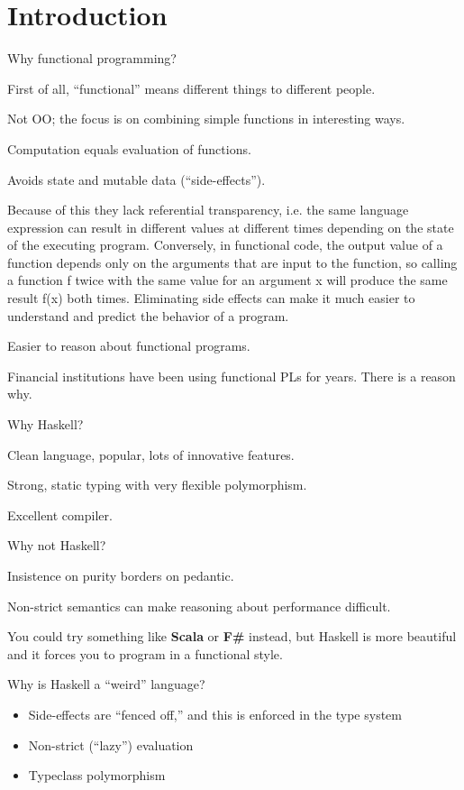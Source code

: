 
\section{Introduction}


%
\begin{frame}{Why functional programming?}

First of all, ``functional'' means different things to different people.

Not OO; the focus is on combining simple functions in interesting ways.

Computation equals evaluation of functions.

Avoids state and mutable data (``side-effects''). 

Because of this they lack referential transparency, i.e. the same language
expression can result in different values at different times depending on the
state of the executing program. Conversely, in functional code, the output value
of a function depends only on the arguments that are input to the function, so
calling a function f twice with the same value for an argument x will produce
the same result f(x) both times. Eliminating side effects can make it much
easier to understand and predict the behavior of a program.

Easier to reason about functional programs.

Financial institutions have been using functional PLs for years. There is a
reason why.

\end{frame}

%
\begin{frame}{Why Haskell?}

Clean language, popular, lots of innovative features.

Strong, static typing with very flexible polymorphism.

Excellent compiler.

\end{frame}

%
\begin{frame}{Why not Haskell?}

Insistence on purity borders on pedantic.

Non-strict semantics can make reasoning about performance difficult.

You could try something like \textbf{Scala} or \textbf{F\#} instead, but Haskell
is more beautiful and it forces you to program in a functional style.

\end{frame}

%
\begin{frame}{Why is Haskell a ``weird'' language?}

\begin{itemize}
  \item Side-effects are ``fenced off,'' and this is enforced in the type system
  \item Non-strict (``lazy'') evaluation
  \item Typeclass polymorphism
\end{itemize}

\end{frame}